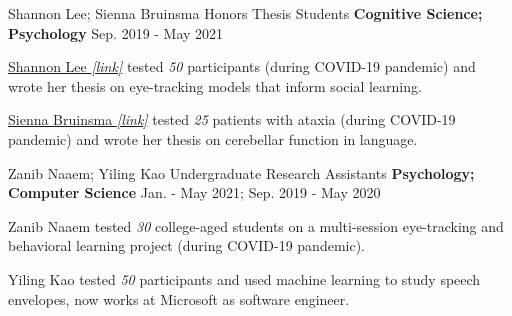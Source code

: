 
\begin{cventries}
 

  \cventry
    {Shannon Lee; Sienna Bruinsma}
    {Honors Thesis Students} %
    {\textbf{Cognitive Science; Psychology}} %
    {Sep. 2019 - May 2021} %
    {
      \begin{cvitems} %
        \item {{\href{https://drive.google.com/file/d/1uhIOkii0y0wMr63KSzlhi7k7NqLEuFlU/view?usp=sharing}{Shannon Lee \textit{[link]}}} tested \textit{50} participants (during COVID-19 pandemic) and wrote her thesis on eye-tracking models that inform social learning.}
        \item {{\href{https://docs.google.com/presentation/d/1GmuGhTJFQFXBuVG_8zfoTIu2ForG47HIdeSV-09GFe8/edit?usp=sharing}{Sienna Bruinsma \textit{[link]}}} tested \textit{25} patients with ataxia (during COVID-19 pandemic) and wrote her thesis on cerebellar function in language.}
      \end{cvitems}
    }
    
    
  \cventry
  	{Zanib Naaem; Yiling Kao}
    {Undergraduate Research Assistants} %
    {\textbf{Psychology; Computer Science}}
   	{Jan. - May 2021; Sep. 2019 - May 2020} %
    {
      \begin{cvitems} %
        \item {Zanib Naaem tested \textit{30} college-aged students on a multi-session eye-tracking and behavioral learning project (during COVID-19 pandemic).}
        \item {Yiling Kao tested \textit{50} participants and used machine learning to study speech envelopes, now works at Microsoft as software engineer.}
      \end{cvitems}
    }
    

\end{cventries}
